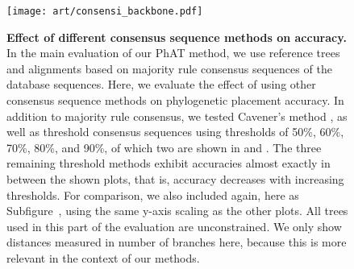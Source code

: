 \begin{figure}[hpbt]
    \centering
    \texttt{[image: art/consensi\_backbone.pdf]}
    \begin{subfigure}{0pt}
        \label{fig:consensi_backbone:sub:majorities}
    \end{subfigure}
    \begin{subfigure}{0pt}
        \label{fig:consensi_backbone:sub:cavener}
    \end{subfigure}
    \begin{subfigure}{0pt}
        \label{fig:consensi_backbone:sub:50_threshold}
    \end{subfigure}
    \begin{subfigure}{0pt}
        \label{fig:consensi_backbone:sub:90_threshold}
    \end{subfigure}
    \caption[Effect of different consensus sequence methods on accuracy]{
        \textbf{Effect of different consensus sequence methods on accuracy.}
        In the main evaluation of our \ac{PhAT} method,
        we use reference trees and alignments based on majority rule consensus sequences \citep{May1952,Day1992a}
        of the  database sequences.
        Here, we evaluate the effect of using other consensus sequence methods
        on phylogenetic placement accuracy.
        In addition to  majority rule consensus, we tested
         Cavener's method \citep{Cavener1987,Cavener1991a},
        as well as threshold consensus sequences \citep{Day1992a,Day1992}
        using thresholds of 50\%, 60\%, 70\%, 80\%, and 90\%, of which two are shown in
         and .
        The three remaining threshold methods exhibit accuracies almost exactly in between the shown plots,
        that is, accuracy decreases with increasing thresholds.
        For comparison, we also included  again,
        here as Subfigure~,
        using the same y-axis scaling as the other plots.
        All trees used in this part of the evaluation are unconstrained.
        We only show distances measured in number of branches here,
        because this is more relevant in the context of our methods.
    }
    \label{fig:consensi_backbone}
\end{figure}

